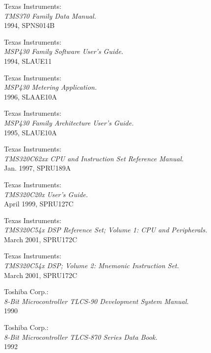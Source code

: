 \documentclass[12pt,twoside]{report}
\begin{document}
\begin{thebibliography}{99}
 Texas Instruments: \\
                {\em TMS370 Family Data Manual.\/} \\
                1994, SPNS014B

 Texas Instruments: \\
                       {\em MSP430 Family Software User's Guide.\/} \\
                       1994, SLAUE11

 Texas Instruments: \\
                   {\em MSP430 Metering Application.\/} \\
                   1996, SLAAE10A

 Texas Instruments: \\
                       {\em MSP430 Family Architecture User's Guide.\/} \\
                       1995, SLAUE10A

 Texas Instruments: \\
                {\em TMS320C62xx CPU and Instruction Set Reference
                 Manual.\/} \\
                Jan. 1997, SPRU189A

 Texas Instruments: \\
                 {\em TMS320C20x User's Guide.\/} \\
                 April 1999, SPRU127C

 Texas Instruments: \\
                     {\em TMS320C54x DSP Reference Set;
                     Volume 1: CPU and Peripherals.\/} \\
                     March 2001, SPRU172C

 Texas Instruments: \\
                     {\em TMS320C54x DSP; Volume 2: Mnemonic Instruction
                     Set.\/} \\
                     March 2001, SPRU172C

 Toshiba Corp.: \\
                 {\em 8-Bit Microcontroller TLCS-90 Development System
                 Manual.\/} \\
                 1990

 Toshiba Corp.: \\
                  {\em 8-Bit Microcontroller TLCS-870 Series Data
                  Book.\/} \\
                  1992


\end{thebibliography}
\end{document}
